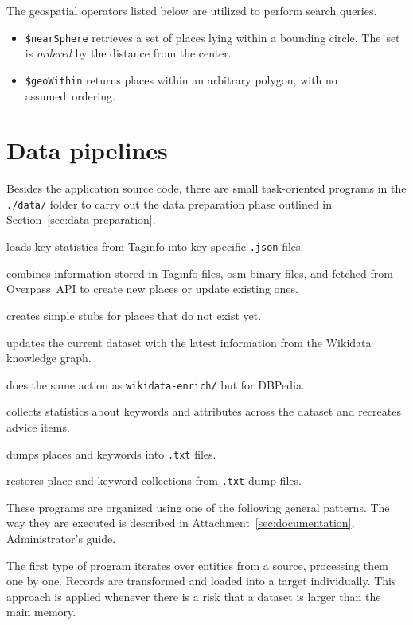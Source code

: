 The geospatial operators listed below are utilized to perform search queries.

\begin{itemize}
\item \texttt{\$nearSphere} retrieves a set of places lying within a bounding circle. The~set is \emph{ordered} by the distance from the center.
\item \texttt{\$geoWithin} returns places within an arbitrary polygon, with no assumed~ordering.
\end{itemize}

\section{Data pipelines}\label{sec:data-pipelines}

Besides the application source code, there are small task-oriented programs in the \texttt{./data/} folder to carry out the data preparation phase outlined in Section~\ref{sec:data-preparation}.

\begin{description}[font=\tt]
\item[taginfo/] loads key statistics from Taginfo into key-specific \texttt{.json} files.
\item[osm/] combines information stored in Taginfo files, \acs{osm} binary files, and fetched from Overpass~API to create new places or update existing ones.
\item[wikidata-create/] creates simple stubs for places that do not exist yet.
\item[wikidata-enrich/] updates the current dataset with the latest information from the Wikidata knowledge graph.
\item[dbpedia/] does the same action as \texttt{wikidata-enrich/} but for DBPedia.
\item[advice/] collects statistics about keywords and attributes across the dataset and recreates advice items.
\item[dump/] dumps places and keywords into \texttt{.txt} files.
\item[restore/] restores place and keyword collections from \texttt{.txt} dump files.
\end{description}

These programs are organized using one of the following general patterns. The way they are executed is described in Attachment~\ref{sec:documentation}, Administrator's guide.

The first type of program iterates over entities from a source, processing them one by one. Records are transformed and loaded into a target individually. This approach is applied whenever there is a risk that a dataset is larger than the main memory.

